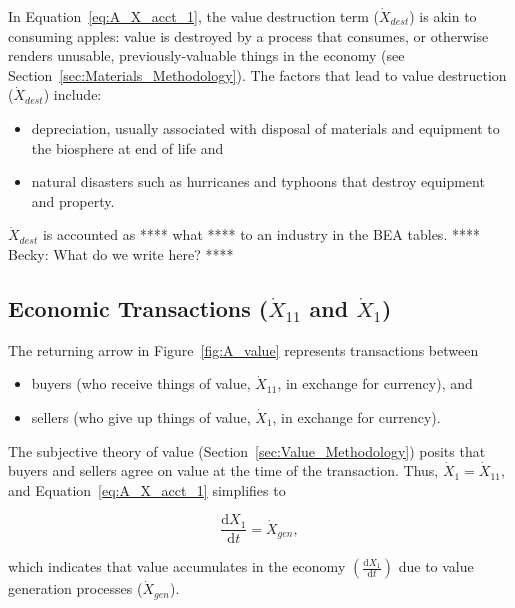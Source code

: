 \noindent In Equation~\ref{eq:A_X_acct_1}, 
the value destruction term ($\dot{X}_{dest}$) 
is akin to consuming apples: 
value is destroyed by a process that consumes, 
or otherwise renders unusable, 
previously-valuable things in the economy
(see Section~\ref{sec:Materials_Methodology}).
The factors that lead to value destruction
($\dot{X}_{dest}$) include:

\begin{itemize}
	\item{depreciation, usually associated with disposal of 
	materials and equipment to the biosphere at end of life and}
	\item{natural disasters such as hurricanes and typhoons
	that destroy equipment and property.}
\end{itemize}

$\dot{X}_{dest}$ is accounted as **** what **** to an industry in the BEA tables.
**** Becky: What do we write here? ****


\subsection{Economic Transactions ($\dot{X}_{11}$ and $\dot{X}_{1}$)}

The returning arrow in Figure~\ref{fig:A_value} 
represents transactions between 
\begin{itemize}
	\item{buyers (who receive things of value, $\dot{X}_{11}$,
	in exchange for currency), and}
	\item{sellers (who give up things of value, $\dot{X}_{1}$,
	in exchange for currency).}
\end{itemize}

The subjective theory of value
(Section~\ref{sec:Value_Methodology})
posits that buyers and sellers agree on value at the 
time of the transaction.
Thus, $\dot{X}_{1} = \dot{X}_{11}$, and Equation~\ref{eq:A_X_acct_1}
simplifies to

\begin{equation} \label{eq:A_X_acct_2}	
	\frac{\mathrm{d}X_{1}}{\mathrm{d}t}	
	= \dot{X}_{gen},
\end{equation}

\noindent which indicates that value accumulates in the economy
$\left( \frac{\mathrm{d}X_{1}}{\mathrm{d}t} \right)$
due to value generation processes ($\dot{X}_{gen}$).


